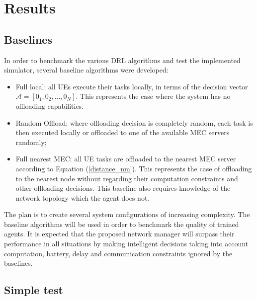 \chapter{Results}

\section{Baselines}
\noindent In order to benchmark the various \acrshort{DRL} algorithms and test the implemented simulator, several baseline algorithms were developed:

\begin{itemize}
    \item Full local: all \acrshort{UE}s execute their tasks locally, in terms of the decision vector $\mathcal{A}=[0_1, 0_2, ..., 0_N]$. This represents the case where the system has no offloading capabilities.
    \item Random Offload: where offloading decision is completely random, each task is then executed locally or offloaded to one of the available \acrshort{MEC} servers randomly;
    \item Full nearest \acrshort{MEC}: all \acrshort{UE} tasks are offloaded to the nearest \acrshort{MEC} server according to Equation (\ref{distance_nm}). This represents the case of offloading to the nearest node without regarding their computation constraints and other offloading decisions. This baseline also requires knowledge of the network topology which the agent does not.
\end{itemize}

The plan is to create several system configurations of increasing complexity. The baseline algorithms will be used in order to benchmark the quality of trained agents. It is expected that the proposed network manager will surpass their performance in all situations by making intelligent decisions taking into account computation, battery, delay and communication constraints ignored by the baselines.

\section{Simple test}

